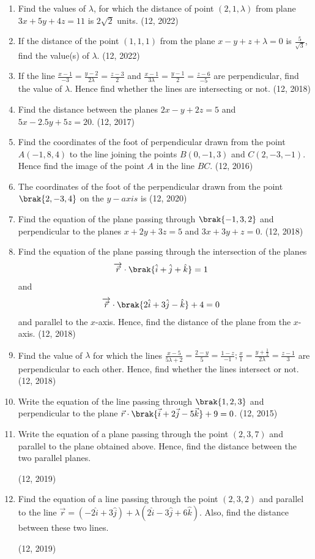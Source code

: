 \begin{enumerate}[label=\thesubsection.\arabic*, ref=\thesubsection.\theenumi]
\item Find the values of $\lambda$, for which the distance of point $(2,1,\lambda)$ from plane $3x+5y+4z=11$ is $2\sqrt{2}$ units. \hfill (12, 2022)
\item If the distance of the point $(1,1,1)$ from the plane $x-y+z+\lambda=0$ is $\frac{5}{\sqrt{3}}$, find the value(s) of $\lambda$. \hfill (12, 2022)
\item If the line $\frac{x-1}{-3} = \frac{y-2}{2\lambda} = \frac{z-3}{2} $ and $\frac{x-1}{3\lambda} = \frac{y-1}{2}  = \frac{z-6}{-5} $ are perpendicular, find the value of $\lambda$. Hence find whether the lines are intersecting or not. \hfill (12, 2018)
\item Find the distance between the planes $2x - y + 2z = 5$ and $5x - 2.5y + 5z = 20$. \hfill (12, 2017)
\item Find the coordinates of the foot of perpendicular drawn from the point
      $A(-1, 8, 4)$ to the line joining the points $B(0, -1, 3)$ and $C(2,-3,-1)$. Hence
      find the image of the point $A$ in the line $BC$. \hfill (12, 2016)
\item The coordinates of the foot of the perpendicular drawn from the point $\brak{2,-3,4}$ on the $y-axis$ is
\hfill (12, 2020)
\item Find the equation of the plane passing through $\brak{-1,3,2}$ and perpendicular to the planes $x+2y+3z=5$ and $3x+3y+z=0$.
\hfill (12, 2018)
\item Find the equation of the plane passing through the intersection of the planes 
\begin{align*}
	\overrightarrow{\vec{r}} \cdot \brak{\hat{i} + \hat{j} + \hat{k}} &= 1
\end{align*}
and 
\begin{align*}
	\overrightarrow{\vec{r}} \cdot \brak{2\hat{i} + 3\hat{j} - \hat{k} } + 4 &= 0
\end{align*}
and parallel to the $x$-axis. Hence, find the distance of the plane from the $x$-axis. \hfill (12, 2018)
 \item Find the value of $\lambda$ for which the lines $\frac{x-5}{5\lambda+2}= \frac{2-y}{5} = \frac{1-z}{-1};\frac{x}{1}=\frac{y+\frac{1}{2}}{2\lambda}=\frac{z-1}{3} $ are perpendicular to each other.
Hence, find whether the lines intersect or not.
\hfill (12, 2018)
\item Write the equation of the line passing through $\brak{1,2,3}$ and perpendicular to the plane $\vec{r}\cdot\brak{\vec{i}+2\vec{j}-5\vec{k}}+9=0$. \hfill (12, 2015)
	\item Write the equation of a plane passing through the point $(2, 3, 7)$ and parallel to the plane obtained above. Hence, find the distance between the two parallel planes.

		\hfill (12, 2019)
	\item Find the  equation of a line passing through the point $(2, 3, 2)$ and parallel to the line $\overrightarrow{r} = (-2\hat{i} + 3\hat{j}) + \lambda (2\hat{i} - 3\hat{j} + 6\hat{k})$. Also, find the distance between these two lines.

		\hfill (12, 2019)
\end{enumerate}
